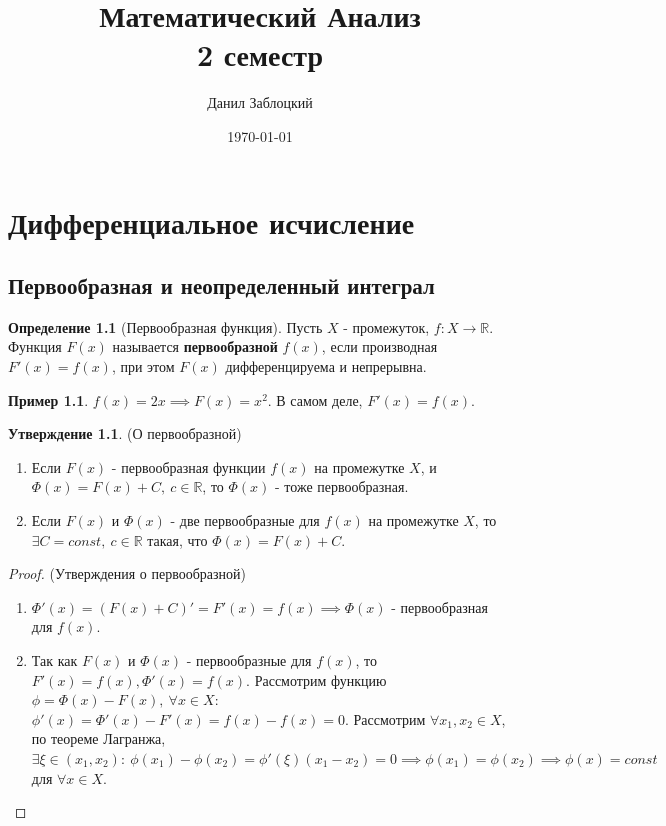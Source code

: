 \documentclass{report}
\title{Математический Анализ \\ 2 семестр}
\author{Данил Заблоцкий}
\date{\today}
\theoremstyle{definition}
\newtheorem{definition}{Определение}[section]
\newtheorem{example}{Пример}
\newtheorem{statement}{Утверждение}[section]
\begin{document}
\maketitle
\tableofcontents
\chapter{Дифференциальное исчисление}

\section{Первообразная и неопределенный интеграл}

\begin{definition}[Первообразная функция]
  Пусть \(X\) - промежуток, \(f:X\rightarrow \mathbb{R}\). Функция \(F(x)\) называется
  \textbf{первообразной} \(f(x)\), если производная \(F'(x) = f(x)\), при этом \(F(x)\)
  дифференцируема и непрерывна.
\end{definition}

\begin{example}
  \(f(x) = 2x \implies F(x) = x^{2}\). В самом деле, \(F'(x) = f(x)\).
\end{example}

\begin{statement}
  (О первообразной)
  \begin{enumerate}
    \item Если \(F(x)\) - первообразная функции \(f(x)\) на промежутке \(X\), и
          \(\varPhi(x) = F(x) + C, \ c \in \mathbb{R}\), то \(\varPhi(x)\) - тоже первообразная.
    \item Если \(F(x)\) и \(\varPhi(x)\) - две первообразные для \(f(x)\) на промежутке \(X\),
          то \(\exists C = const, \ c \in \mathbb{R}\) такая, что \(\varPhi(x) = F(x) + C\).
  \end{enumerate}
\end{statement}

\begin{proof}
  (Утверждения о первообразной)
  \begin{enumerate}
    \item \(\Phi'(x) = (F(x) + C)' = F'(x) = f(x) \implies \Phi(x)\)
          - первообразная для \(f(x)\).
    \item Так как \(F(x)\) и \(\Phi(x)\) - первообразные для \(f(x)\), то \(F'(x) = f(x),
          \Phi'(x) = f(x)\). Рассмотрим функцию \(\phi = \Phi(x) - F(x), \ \forall x \in X\):
          \(\phi'(x) = \Phi'(x) - F'(x) = f(x) - f(x) = 0\). Рассмотрим
          \(\forall x_{1}, x_{2} \in X\), по теореме Лагранжа, \(\exists \xi \in (x_{1}, x_{2}):
          \ \phi(x_{1}) - \phi(x_{2}) = \phi'(\xi)(x_{1} - x_{2}) = 0 \implies \phi(x_{1}) =
          \phi(x_{2}) \implies \phi(x) = const\) для \(\forall x \in X\).
  \end{enumerate}
\end{proof}
\end{document}
